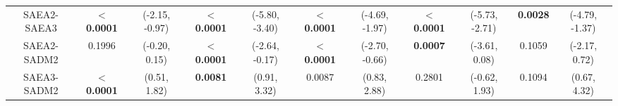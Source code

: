 \begin{landscape}
\begin{table}[]
\begin{tabular}{ccccccccccc}
						SAEA2-SAEA3             & $\boldsymbol{<}$\textbf{0.0001} & (-2.15, -0.97) & $\boldsymbol{<}$\textbf{0.0001} & (-5.80, -3.40) & $\boldsymbol{<}$\textbf{0.0001} & (-4.69, -1.97) & $\boldsymbol{<}$\textbf{0.0001} & (-5.73, -2.71) & \textbf{0.0028} &(-4.79, -1.37)                                        \\\rowcolor{gray1}
						SAEA2-SADM2             & 0.1996                     & (-0.20, 0.15)  & $\boldsymbol{<}$\textbf{0.0001} & (-2.64, -0.17)  & $\boldsymbol{<}$\textbf{0.0001} & (-2.70, -0.66) & \textbf{0.0007}       & (-3.61, 0.08)   & 0.1059             & (-2.17, 0.72)                                        \\\rowcolor{gray2}
						SAEA3-SADM2             & $\boldsymbol{<}$\textbf{0.0001} & (0.51, 1.82)    & \textbf{0.0081}        & (0.91, 3.32)     & 0.0087                       & (0.83, 2.88)   & 0.2801                    & (-0.62, 1.93)   & 0.1094             & (0.67, 4.32)                                                         
					\end{tabular}
					\label{tab:results:benchmark:zetas:pvalues}
				\end{table}
			\end{landscape}
		
